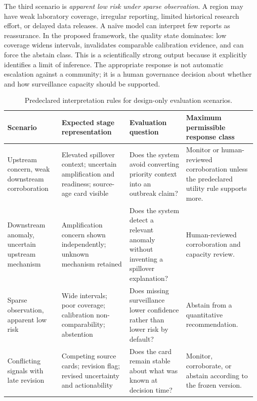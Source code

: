\documentclass[conference]{IEEEtran}
\begin{document}
The third scenario is \emph{apparent low risk under sparse observation}. A region may have weak laboratory coverage, irregular reporting, limited historical research effort, or delayed data releases. A naïve model can interpret few reports as reassurance. In the proposed framework, the quality state dominates: low coverage widens intervals, invalidates comparable calibration evidence, and can force the abstain class. This is a scientifically strong output because it explicitly identifies a limit of inference. The appropriate response is not automatic escalation against a community; it is a human governance decision about whether and how surveillance capacity should be supported.

\begin{table}[t]
\caption{Predeclared interpretation rules for design-only evaluation scenarios.}
\label{tab:scenarios}
\centering
\renewcommand{\arraystretch}{1.15}
\begin{tabular}{|p{}|p{}|p{}|p{}|}
\hline
\textbf{Scenario} & \textbf{Expected stage representation} & \textbf{Evaluation question} & \textbf{Maximum permissible response class} \\
\hline
Upstream concern, weak downstream corroboration & Elevated spillover context; uncertain amplification and readiness; source-age card visible & Does the system avoid converting priority context into an outbreak claim? & Monitor or human-reviewed corroboration unless the predeclared utility rule supports more. \\
\hline
Downstream anomaly, uncertain upstream mechanism & Amplification concern shown independently; unknown mechanism retained & Does the system detect a relevant anomaly without inventing a spillover explanation? & Human-reviewed corroboration and capacity review. \\
\hline
Sparse observation, apparent low risk & Wide intervals; poor coverage; calibration non-comparability; abstention & Does missing surveillance lower confidence rather than lower risk by default? & Abstain from a quantitative recommendation. \\
\hline
Conflicting signals with late revision & Competing source cards; revision flag; revised uncertainty and actionability & Does the card remain stable about what was known at decision time? & Monitor, corroborate, or abstain according to the frozen version. \\
\hline
\end{tabular}
\end{table}
\end{document}
